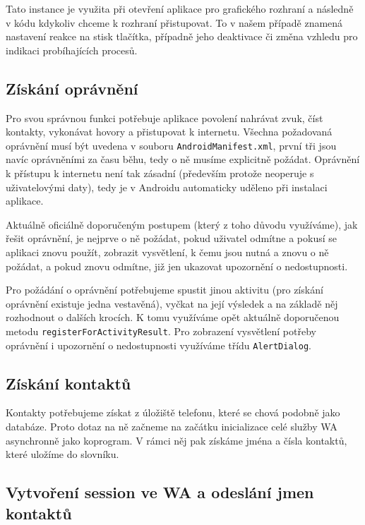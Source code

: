 Tato instance je využita při otevření aplikace pro  grafického
rozhraní a následně v kódu kdykoliv chceme k rozhraní přistupovat. To v našem
případě znamená nastavení reakce na stisk tlačítka, případně jeho deaktivace
či změna vzhledu pro indikaci probíhajících procesů.

\subsection{Získání oprávnění}

Pro svou správnou funkci potřebuje aplikace povolení nahrávat zvuk, číst
kontakty, vykonávat hovory a přistupovat k internetu. Všechna požadovaná
oprávnění musí být uvedena v souboru \texttt{AndroidManifest.xml}, první
tři jsou navíc oprávněními za času běhu, tedy o ně musíme explicitně
požádat. Oprávnění k přístupu k internetu není tak zásadní (především
protože neoperuje s uživatelovými daty), tedy je v Androidu automaticky
uděleno při instalaci aplikace.

Aktuálně oficiálně doporučeným postupem (který z toho důvodu využíváme), jak
řešit oprávnění, je nejprve o ně požádat, pokud uživatel odmítne a pokusí se
aplikaci znovu použít, zobrazit vysvětlení, k čemu jsou nutná a znovu o ně
požádat, a pokud znovu odmítne, již jen ukazovat upozornění o nedostupnosti.

Pro požádání o oprávnění potřebujeme spustit jinou aktivitu (pro získání
oprávnění existuje jedna vestavěná), vyčkat na její výsledek a na základě
něj rozhodnout o dalších krocích. K tomu využíváme opět aktuálně doporučenou
metodu \texttt{registerForActivityResult}. Pro zobrazení vysvětlení potřeby
oprávnění i upozornění o nedostupnosti využíváme třídu \texttt{AlertDialog}.

\subsection{Získání kontaktů}

Kontakty potřebujeme získat z úložiště telefonu, které se chová podobně jako
databáze. Proto dotaz na ně začneme na začátku inicializace celé služby WA
asynchronně jako koprogram. V rámci něj pak získáme jména a čísla kontaktů,
které uložíme do slovníku.

\subsection{Vytvoření session ve WA a odeslání jmen kontaktů}

